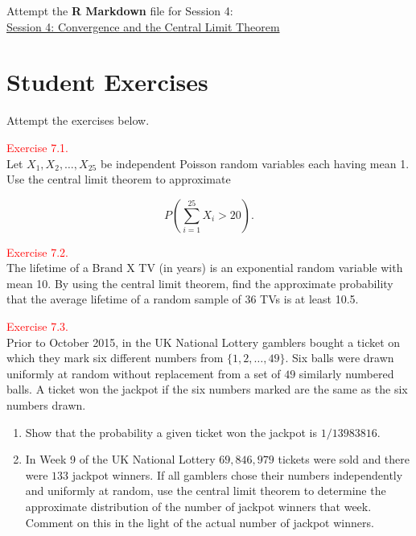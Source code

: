 \documentclass[
]{book}
\providecommand{\tightlist}{%
  \setlength{\itemsep}{0pt}\setlength{\parskip}{0pt}}
\begin{document}
Attempt the \textbf{R Markdown} file for Session 4:\\
\href{https://moodle.nottingham.ac.uk/course/view.php?id=134982\#section-2}{Session 4: Convergence and the Central Limit Theorem}

\hypertarget{Sec_clt:exer}{%
\section*{\texorpdfstring{{\textbf{Student Exercises}}}{Student Exercises}}\label{Sec_clt:exer}}

Attempt the exercises below.

\hypertarget{exer7:1}{}
\textcolor{red}{Exercise 7.1.}\\
Let \(X_1, X_2, \dots, X_{25}\) be independent Poisson random variables each having mean 1. Use the central limit theorem to approximate

\[ P\left( \sum_{i=1}^{25} X_i > 20 \right).\]

\hfill\break

\leavevmode{}%
\textcolor{red}{Exercise 7.2.}\\
The lifetime of a Brand X TV (in years) is an exponential random variable with
mean 10. By using the central limit theorem, find the approximate probability
that the average lifetime of a random sample of 36 TVs is at least 10.5.

\hfill\break

\leavevmode{}%
\textcolor{red}{Exercise 7.3.}\\
Prior to October 2015,
in the UK National Lottery gamblers bought a ticket on which they mark six different numbers from
\(\{ 1,2,\ldots,49 \}\). Six balls were drawn uniformly at random without replacement from a set of \(49\) similarly numbered balls. A ticket won the jackpot if the six numbers marked are the same as the six numbers drawn.

\begin{enumerate}
\def\labelenumi{(\alph{enumi})}
\tightlist
\item
  Show that the probability a given ticket won the jackpot is \(1/13983816\).\\
\item
  In Week 9 of the UK National Lottery \(69,846,979\) tickets were sold and there were \(133\) jackpot winners. If all gamblers chose their numbers independently and uniformly at random, use the central limit theorem to determine the approximate distribution of the number of jackpot winners that week. Comment on this in the light of the actual number of jackpot winners.\\
\end{enumerate}
\end{document}
